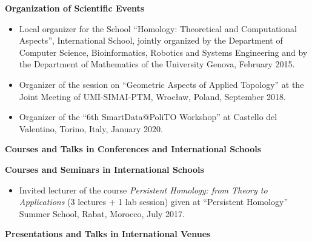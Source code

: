 \documentclass[11pt]{article}
\begin{document}
\vspace*{1ex}
\noindent
{\bf Organization of Scientific Events}
\begin{itemize}
\item Local organizer for the School ``Homology: Theoretical and
Computational Aspects'',  International School, jointly organized by the Department of Computer Science, Bioinformatics, Robotics and Systems Engineering and by the Department of Mathematics of the University Genova, February 2015.
\item Organizer of the session on ``Geometric Aspects of Applied Topology'' at the Joint Meeting of UMI-SIMAI-PTM, Wroc\l{}aw, Poland, September 2018.
\item Organizer of the ``6th SmartData@PoliTO Workshop'' at Castello del Valentino, Torino, Italy, January 2020.
\end{itemize}

\vspace*{2.5ex}
\noindent
{\Large\bf Courses and Talks in Conferences and International Schools}

\vspace*{1.5ex}
\noindent
{\bf Courses and Seminars in International Schools}

\begin{itemize}
  \item Invited lecturer of the course {\em Persistent Homology: from Theory to Applications} (3 lectures + 1 lab session) given at ``Persistent Homology'' Summer School, Rabat, Morocco, July 2017.
\end{itemize}

\vspace*{1ex}
\noindent
{\bf Presentations and Talks in International Venues}
\end{document}
